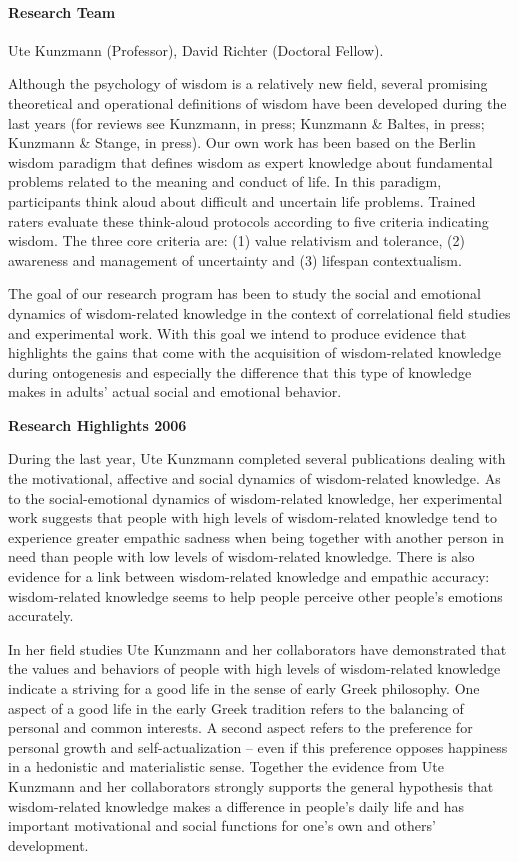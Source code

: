 
\paragraph{Research Team}
Ute Kunzmann (Professor), David Richter (Doctoral Fellow).

 Although the psychology of wisdom is a relatively new field, several promising theoretical and operational definitions of wisdom have been developed during the last years (for reviews see Kunzmann, in press; Kunzmann \& Baltes, in press; Kunzmann \& Stange, in press). Our own work has been based on the Berlin wisdom paradigm that defines wisdom as expert knowledge about fundamental problems related to the meaning and conduct of life. In this paradigm, participants think aloud about difficult and uncertain life problems. Trained raters evaluate these think-aloud protocols according to five criteria indicating wisdom. The three core criteria are: (1) value relativism and tolerance, (2) awareness and management of uncertainty and (3) lifespan contextualism. 

 The goal of our research program has been to study the social and emotional dynamics of wisdom-related knowledge in the context of correlational field studies and experimental work. With this goal we intend to produce evidence that highlights the gains that come with the acquisition of wisdom-related knowledge during ontogenesis and especially the difference that this type of knowledge makes in adults' actual social and emotional behavior.

\null
\textbf{Research Highlights 2006}

 During the last year, Ute Kunzmann completed several publications dealing with the motivational, affective and social dynamics of wisdom-related knowledge. As to the social-emotional dynamics of wisdom-related knowledge, her experimental work suggests that people with high levels of wisdom-related knowledge tend to experience greater empathic sadness when being together with another person in need than people with low levels of wisdom-related knowledge. There is also evidence for a link between wisdom-related knowledge and empathic accuracy: wisdom-related knowledge seems to help people perceive other people's emotions accurately. 

 In her field studies Ute Kunzmann and her collaborators have demonstrated that the values and behaviors of people with high levels of wisdom-related knowledge indicate a striving for a good life in the sense of early Greek philosophy. One aspect of a good life in the early Greek tradition refers to the balancing of personal and common interests. A second aspect refers to the preference for personal growth and self-actualization -- even if this preference opposes happiness in a hedonistic and materialistic sense. Together the evidence from Ute Kunzmann and her collaborators strongly supports the general hypothesis that wisdom-related knowledge makes a difference in people's daily life and has important motivational and social functions for one's own and others' development. 

